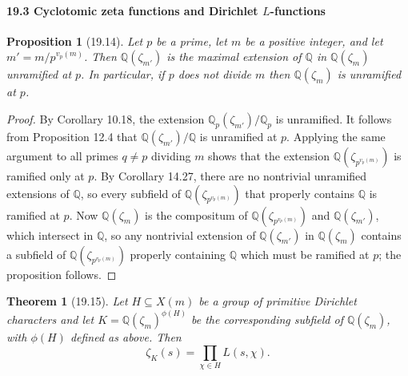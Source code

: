 \documentclass[UTF8,11pt]{ctexart}
\newtheorem*{theorem}{Theorem}
\newtheorem*{proposition}{Proposition}
\theoremstyle{definition}
\newcommand{\Q}{\mathbb Q}
\begin{document}
\paragraph{19.3 Cyclotomic zeta functions and Dirichlet $L$-functions}
\begin{proposition}[19.14]
Let $p$ be a prime, let $m$ be a positive integer, and let $m'=m/p^{v_p(m)}$. Then $\Q(\zeta_{m'})$ is the maximal extension of $\Q$ in $\Q(\zeta_m)$ unramified at $p$. In particular, if $p$ does not divide $m$ then $\Q(\zeta_m)$ is unramified at $p$.
\end{proposition}
\begin{proof}
By Corollary 10.18, the extension $\Q_p(\zeta_{m'})/\Q_p$ is unramified. It follows from Proposition 12.4 that $\Q(\zeta_{m'})/\Q$ is unramified at $p$. Applying the same argument to all primes $q\ne p$ dividing $m$ shows that the extension $\Q(\zeta_{p^{v_p(m)}})$ is ramified only at $p$. By Corollary 14.27, there are no nontrivial unramified extensions of $\Q$, so every subfield of $\Q(\zeta_{p^{v_p(m)}})$ that properly contains $\Q$ is ramified at $p$. Now $\Q(\zeta_m)$ is the compositum of $\Q(\zeta_{p^{v_p(m)}})$ and $\Q(\zeta_{m'})$, which intersect in $\Q$, so any nontrivial extension of $\Q(\zeta_{m'})$ in $\Q(\zeta_m)$ contains a subfield of $\Q(\zeta_{p^{v_p(m)}})$ properly containing $\Q$ which must be ramified at $p$; the proposition follows.
\end{proof}
\begin{theorem}[19.15]
Let $H\subseteq X(m)$ be a group of primitive Dirichlet characters and let $K=\Q(\zeta_m)^{\phi(H)}$ be the corresponding subfield of $\Q(\zeta_m)$, with $\phi(H)$ defined as above. Then
\[
\zeta_K(s)=\prod_{\chi\in H}L(s,\chi).
\]
\end{theorem}
\end{document}
